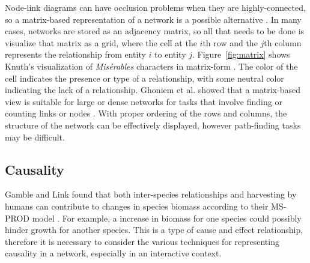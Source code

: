 Node-link diagrams can have occlusion problems when they are highly-connected, so a matrix-based representation of a network is a possible alternative \cite{heer2010}.  In many cases, networks are stored as an adjacency matrix, so all that needs to be done is visualize that matrix as a grid, where the cell at the $i$th row and the $j$th column represents the relationship from entity $i$ to entity $j$.  Figure~\ref{fig:matrix} shows Knuth's visualization of \textit{Mis\'erables} characters in matrix-form \cite{knuth1993}.  The color of the cell indicates the presence or type of a relationship, with some neutral color indicating the lack of a relationship.  Ghoniem et al. showed that a matrix-based view is suitable for large or dense networks for tasks that involve finding or counting links or nodes \cite{ghoniem2004}.  With proper ordering of the rows and columns, the structure of the network can be effectively displayed, however path-finding tasks may be difficult.

\subsection{Causality}

Gamble and Link found that both inter-species relationships and harvesting by humans can contribute to changes in species biomass according to their MS-PROD model \cite{gamble2009}.  For example, a increase in biomass for one species could possibly hinder growth for another species.  This is a type of cause and effect relationship, therefore it is necessary to consider the various techniques for representing causality in a network, especially in an interactive context.

